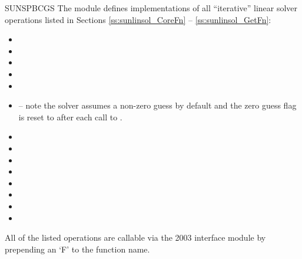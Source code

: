 {SUNSPBCGS}
%
%
The {\sunlinsolspbcgs} module defines implementations of all
``iterative'' linear solver operations listed in Sections
\ref{ss:sunlinsol_CoreFn} -- \ref{ss:sunlinsol_GetFn}:
\begin{itemize}
\item {}
\item {}
\item {}
\item {}
\item {}
\item {}  -- note the solver assumes a non-zero
  guess by default and the zero guess flag is reset to  after each
  call to .
\item {}
\item {}
\item {}
\item {}
\item {}
\item {}
\item {}
\item {}
\end{itemize}
All of the listed operations are callable via the {\F} 2003 interface module
by prepending an `F' to the function name.

